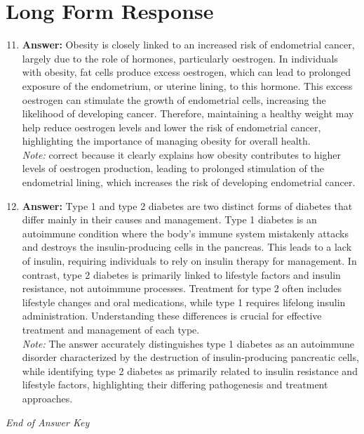 \documentclass[12pt]{article}
\begin{document}
\section*{Long Form Response}
\begin{enumerate}[label=\arabic*.]
\setcounter{enumi}{10}
\item \textbf{Answer:} Obesity is closely linked to an increased risk of endometrial cancer, largely due to the role of hormones, particularly oestrogen. In individuals with obesity, fat cells produce excess oestrogen, which can lead to prolonged exposure of the endometrium, or uterine lining, to this hormone. This excess oestrogen can stimulate the growth of endometrial cells, increasing the likelihood of developing cancer. Therefore, maintaining a healthy weight may help reduce oestrogen levels and lower the risk of endometrial cancer, highlighting the importance of managing obesity for overall health.
\\ \textit{Note:} correct because it clearly explains how obesity contributes to higher levels of oestrogen production, leading to prolonged stimulation of the endometrial lining, which increases the risk of developing endometrial cancer.
\item \textbf{Answer:} Type 1 and type 2 diabetes are two distinct forms of diabetes that differ mainly in their causes and management. Type 1 diabetes is an autoimmune condition where the body's immune system mistakenly attacks and destroys the insulin-producing cells in the pancreas. This leads to a lack of insulin, requiring individuals to rely on insulin therapy for management. In contrast, type 2 diabetes is primarily linked to lifestyle factors and insulin resistance, not autoimmune processes. Treatment for type 2 often includes lifestyle changes and oral medications, while type 1 requires lifelong insulin administration. Understanding these differences is crucial for effective treatment and management of each type.
\\ \textit{Note:} The answer accurately distinguishes type 1 diabetes as an autoimmune disorder characterized by the destruction of insulin-producing pancreatic cells, while identifying type 2 diabetes as primarily related to insulin resistance and lifestyle factors, highlighting their differing pathogenesis and treatment approaches.
\end{enumerate}

\vfill
\noindent\textit{End of Answer Key}
\end{document}
